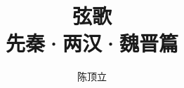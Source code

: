 \documentclass[UTF8, 12pt, openany, fontset=none]{ctexbook}
\title{弦歌\\[0.6em]{\Large 先秦·两汉·魏晋篇}}
\author{陈顶立}
\date{}
\begin{document}
\makecover
\tableofcontents

\end{document}

